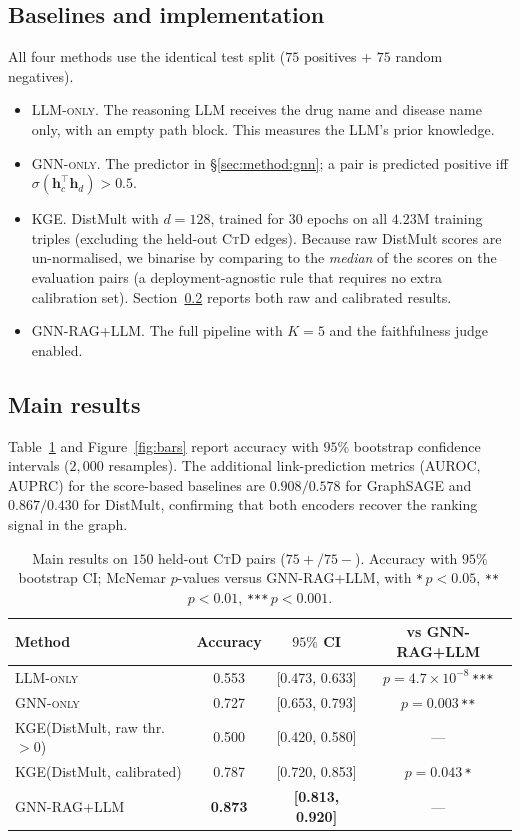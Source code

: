 \documentclass{article}
\newcommand{\ours}{\textsc{GNN-RAG+LLM}\xspace}
\newcommand{\gnno}{\textsc{GNN-only}\xspace}
\newcommand{\llmo}{\textsc{LLM-only}\xspace}
\newcommand{\kge}{\textsc{KGE}\xspace}
\newcommand{\ctd}{\textsc{CtD}\xspace}
\begin{document}
\subsection{Baselines and implementation}
All four methods use the identical test split ($75$ positives + $75$ random negatives).
\begin{itemize}
    \item \llmo. The reasoning LLM receives the drug name and disease name only, with an empty path block. This measures the LLM's prior knowledge.
    \item \gnno. The predictor in \S\ref{sec:method:gnn}; a pair is predicted positive iff $\sigma(\mathbf{h}_c^{\top}\mathbf{h}_d)>0.5$.
    \item \kge. DistMult with $d{=}128$, trained for $30$ epochs on all $4.23\mathrm{M}$ training triples (excluding the held-out \ctd edges). Because raw DistMult scores are un-normalised, we binarise by comparing to the \emph{median} of the scores on the evaluation pairs (a deployment-agnostic rule that requires no extra calibration set). Section~\ref{sec:exp:main} reports both raw and calibrated results.
    \item \ours. The full pipeline with $K{=}5$ and the faithfulness judge enabled.
\end{itemize}

\subsection{Main results}
\label{sec:exp:main}

Table~\ref{tab:main} and Figure~\ref{fig:bars} report accuracy with $95\%$ bootstrap confidence intervals ($2{,}000$ resamples). The additional link-prediction metrics (AUROC, AUPRC) for the score-based baselines are $0.908/0.578$ for GraphSAGE and $0.867/0.430$ for DistMult, confirming that both encoders recover the ranking signal in the graph.

\begin{table}[t]
\centering
\small
\caption{Main results on $150$ held-out \ctd pairs ($75{+}/75{-}$). Accuracy with $95\%$ bootstrap CI; McNemar $p$-values versus \ours, with \texttt{*}\,$p{<}0.05$, \texttt{**}\,$p{<}0.01$, \texttt{***}\,$p{<}0.001$.}
\label{tab:main}
\begin{tabular}{@{}lccc@{}}
\toprule
Method & Accuracy & $95\%$ CI & vs \ours \\
\midrule
\llmo                           & 0.553 & [0.473, 0.633] & $p{=}4.7{\times}10^{-8}$\,\texttt{***} \\
\gnno                           & 0.727 & [0.653, 0.793] & $p{=}0.003$\,\texttt{**} \\
\kge (DistMult, raw thr.\ $>0$) & 0.500 & [0.420, 0.580] & --- \\
\kge (DistMult, calibrated)     & 0.787 & [0.720, 0.853] & $p{=}0.043$\,\texttt{*} \\
\rowcolor{accent!8}\ours        & \textbf{0.873} & \textbf{[0.813, 0.920]} & --- \\
\bottomrule
\end{tabular}
\end{table}
\end{document}
